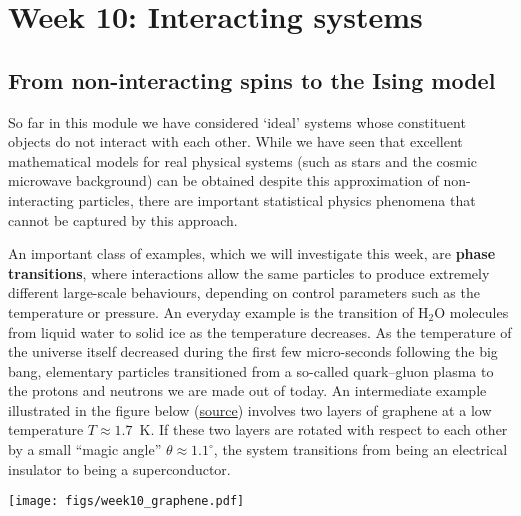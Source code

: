 \renewcommand{\thisweek}{MATH327 Week 10}
\renewcommand{\moddate}{Last modified 4 May 2021}
\setcounter{section}{10}
\setcounter{subsection}{0}
{}
\section*{Week 10: Interacting systems}
\subsection{\label{sec:Ising}From non-interacting spins to the Ising model}
So far in this module we have considered `ideal' systems whose constituent objects do not interact with each other.
While we have seen that excellent mathematical models for real physical systems (such as stars and the cosmic microwave background) can be obtained despite this approximation of non-interacting particles, there are important statistical physics phenomena that cannot be captured by this approach.

An important class of examples, which we will investigate this week, are \textbf{phase transitions}, where interactions allow the same particles to produce extremely different large-scale behaviours, depending on control parameters such as the temperature or pressure.
An everyday example is the transition of H$_2$O molecules from liquid water to solid ice as the temperature decreases.
As the temperature of the universe itself decreased during the first few micro-seconds following the big bang, elementary particles transitioned from a so-called quark--gluon plasma to the protons and neutrons we are made out of today.
An intermediate example illustrated in the figure below (\href{https://doi.org/10.1063/PT.3.4384}{source}) involves two layers of graphene at a low temperature $T \approx 1.7$~K.
If these two layers are rotated with respect to each other by a small ``magic angle'' $\theta \approx 1.1^{\circ}$, the system transitions from being an electrical insulator to being a superconductor.

\begin{center}\texttt{[image: figs/week10\_graphene.pdf]}\end{center}

